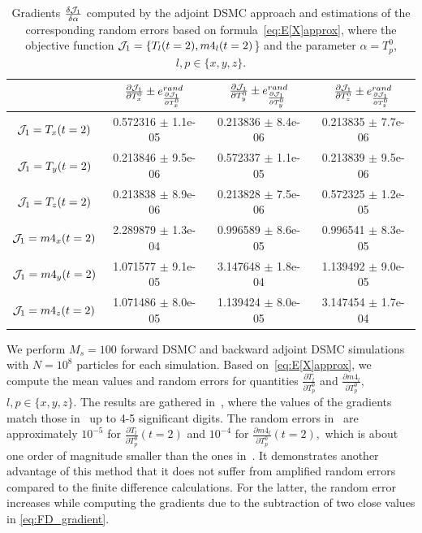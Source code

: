 \documentclass[times,final,nopreprintline]{elsarticle}
\begin{document}
\begin{table}
\small
\setlength{\tabcolsep}{4pt}
\centering 
\begin{tabular}{|c|c|c|c|} 
  \hline
\rule{0pt}{10pt}  & $\frac{\partial \mathcal J_1}{\partial T_x^0} \pm e^{rand}_{\frac{\partial \mathcal J_1}{\partial T_x^0}}$ & $\frac{\partial \mathcal J_1}{\partial T_y^0} \pm e^{rand}_{\frac{\partial \mathcal J_1}{\partial T_y^0}}$ & $\frac{\partial \mathcal J_1}{\partial T_z^0} \pm e^{rand}_{\frac{\partial \mathcal J_1}{\partial T_z^0}}$ \\
  \hline
$\mathcal J_1=T_x(t=2)$  &  0.572316 $\pm$  1.1e-05  &  0.213836 $\pm$  8.4e-06  &  0.213835 $\pm$  7.7e-06  \\
$\mathcal J_1=T_y(t=2)$  &  0.213846 $\pm$  9.5e-06  &  0.572337 $\pm$  1.1e-05  &  0.213839 $\pm$  9.5e-06  \\
$\mathcal J_1=T_z(t=2)$  &  0.213838 $\pm$  8.9e-06  &  0.213828 $\pm$  7.5e-06  &  0.572325 $\pm$  1.2e-05  \\
$\mathcal J_1=m4_x(t=2)$ &  2.289879 $\pm$  1.3e-04  &  0.996589 $\pm$  8.6e-05  &  0.996541 $\pm$  8.3e-05  \\
$\mathcal J_1=m4_y(t=2)$ &  1.071577 $\pm$  9.1e-05  &  3.147648 $\pm$  1.8e-04  &  1.139492 $\pm$  9.0e-05  \\
$\mathcal J_1=m4_z(t=2)$ &  1.071486 $\pm$  8.0e-05  &  1.139424 $\pm$  8.0e-05  &  3.147454 $\pm$  1.7e-04  \\
   \hline
\end{tabular} 
  \caption{Gradients $\frac{\delta \mathcal J_1}{\delta \alpha}$ computed by the adjoint DSMC approach and estimations of the corresponding random errors based on formula~\eqref{eq:E[X]approx}, where the objective function $\mathcal J_1=\{T_l(t=2),m4_l(t=2)$\} and the parameter $\alpha=T_p^0$, $l,p\in\{x,y,z\}$.}\label{Table4}
\end{table} 

We perform $M_s=100$ forward DSMC and backward adjoint DSMC simulations with $N=10^8$ particles for each simulation. Based on~\eqref{eq:E[X]approx}, we compute the mean values and random errors  for quantities $\frac{\partial T_l}{\partial T_p^0}$ and $\frac{\partial m4_l}{\partial T_p^0}$, $l,p\in\{x,y,z\}$. The results are gathered in~, where the values of the gradients match those in~ up to 4-5 significant digits. The random errors in~ are approximately $10^{-5}$ for 
$\frac{\partial T_l}{\partial T_p^0}(t=2)$ and $10^{-4}$ for $\frac{\partial m4_l}{\partial T_p^0}(t=2),$
which is about one order of magnitude smaller than the ones in~. It demonstrates another advantage of this method that it does not suffer from amplified random errors compared to the finite difference calculations. For the latter, the random error increases while computing the gradients due to the subtraction of two close values in \eqref{eq:FD_gradient}.
\end{document}
